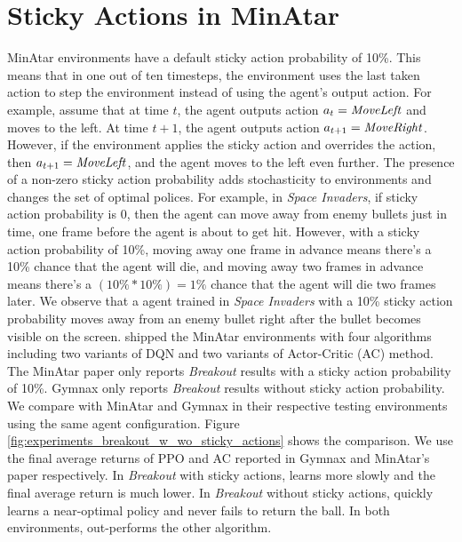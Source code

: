 \section{Sticky Actions in MinAtar} \label{sec:sticky_minatar}
MinAtar environments have a default sticky action probability of 10\%.
This means that in one out of ten timesteps, the environment uses the last taken action to step the environment instead of using the agent's output action.
For example, assume that at time $t$, the agent outputs action $a_t = \text{\textit{MoveLeft}}$ and moves to the left.
At time $t+1$, the agent outputs action $a_{t+1} = \text{\textit{MoveRight}}$.
However, if the environment applies the sticky action and overrides the action, then $a_{t+1} = \text{\textit{MoveLeft}}$, and the agent moves to the left even further.
The presence of a non-zero sticky action probability adds stochasticity to environments and changes the set of optimal polices.
For example, in \textit{Space Invaders}, if sticky action probability is 0, then the agent can move away from enemy bullets just in time, one frame before the agent is about to get hit.
However, with a sticky action probability of 10\%, moving away one frame in advance means there's a 10\% chance that the agent will die, and moving away two frames in advance means there's a $(10\% * 10\%) = 1\%$ chance that the agent will die two frames later.
We observe that a \moozi agent trained in \textit{Space Invaders} with a 10\% sticky action probability moves away from an enemy bullet right after the bullet becomes visible on the screen.
\citeauthor{MinAtarAtariInspiredTestbed_Young.Tian_2019} shipped the MinAtar environments with four algorithms including two variants of DQN and two variants of Actor-Critic (AC) method.
The MinAtar paper \cite{MinAtarAtariInspiredTestbed_Young.Tian_2019} only reports \textit{Breakout} results with a sticky action probability of 10\%.
Gymnax only reports \textit{Breakout} results without sticky action probability.
We compare with MinAtar and Gymnax in their respective testing environments using the same \moozi agent configuration.
Figure \ref{fig:experiments_breakout_w_wo_sticky_actions} shows the comparison.
We use the final average returns of PPO and AC reported in Gymnax and MinAtar's paper respectively.
In \textit{Breakout} with sticky actions, \moozi learns more slowly and the final average return is much lower.
In \textit{Breakout} without sticky actions, \moozi quickly learns a near-optimal policy and never fails to return the ball.
In both environments, \moozi out-performs the other algorithm.
